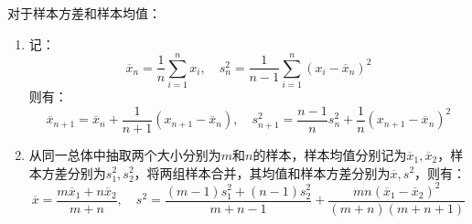 \begin{theorem}
	对于样本方差和样本均值：
	\begin{enumerate}
		\item 记：
		\begin{equation*}
			\overline{x}_n=\frac{1}{n}\sum_{i=1}^{n}x_i,\quad s_n^2=\frac{1}{n-1}\sum_{i=1}^{n}(x_i-\overline{x}_n)^2
		\end{equation*}
		则有：
		\begin{equation*}
			\overline{x}_{n+1}=\overline{x}_n+\frac{1}{n+1}(x_{n+1}-\overline{x}_n),\quad s_{n+1}^2=\frac{n-1}{n}s_n^2+\frac{1}{n}(x_{n+1}-\overline{x}_n)^2
		\end{equation*}
		\item 从同一总体中抽取两个大小分别为$m$和$n$的样本，样本均值分别记为$\overline{x}_1,\overline{x}_2$，样本方差分别为$s_1^2,s_2^2$，将两组样本合并，其均值和样本方差分别为$\overline{x},s^2$，则有：
		\begin{equation*}
			\overline{x}=\frac{m\overline{x}_1+n\overline{x}_2}{m+n},\quad s^2=\frac{(m-1)s_1^2+(n-1)s_2^2}{m+n-1}+\frac{mn(\overline{x}_1-\overline{x}_2)^2}{(m+n)(m+n+1)}
		\end{equation*}
	\end{enumerate}
\end{theorem}
